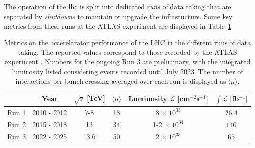 The operation of the \gls{lhc} is split into dedicated \textit{runs} of data taking that are separated by \textit{shutdowns} to maintain or upgrade the infrastucture. Some key metrics from these runs at the ATLAS experiment are displayed in Table~\ref{tbl:LHCATLASperf}
\begin{table}[!htbp]
    \begin{center}
        \renewcommand{\arraystretch}{1.2}
        \begin{tabular}{cc|cccc} \hline \hline 
          & Year & $\sqrt{s}$ [TeV] & $\langle \mu \rangle$ &  Luminosity $\mathcal{L}$ [cm$^{-2}$s$^{-1}$] & $\int\mathcal{L}$ [fb$^{-1}$] \\ \hline
          Run 1 & 2010 - 2012 & 7-8    & 18 & 8 $\times$ $10^{33}$    & $26.4$ \\
          Run 2 & 2015 - 2018 & 13     & 34 & 1-2 $\times$ $10^{34}$  & $140$ \\
          Run 3 & 2022 - 2025 & 13.6     & 50 & 2 $\times$ $10^{33}$    & $65$ \\

          \hline\hline
        \end{tabular}
      \caption{Metrics on the accerelarator performance of the LHC in the different runs of data taking. The reported values correspond to those recorded by the ATLAS experiment \cite{ATLAS:run1Lumi, ATLAS:2022hro, ATL-DAPR-PUB-2023-001}. Numbers for the ongoing Run 3 are preliminary, with the integrated luminosity listed considering events recorded until July 2023. The number of interactions per bunch crossing averaged over each run is displayed as $\langle \mu \rangle$.} %
      \label{tbl:LHCATLASperf}
    \end{center}
  \end{table}

